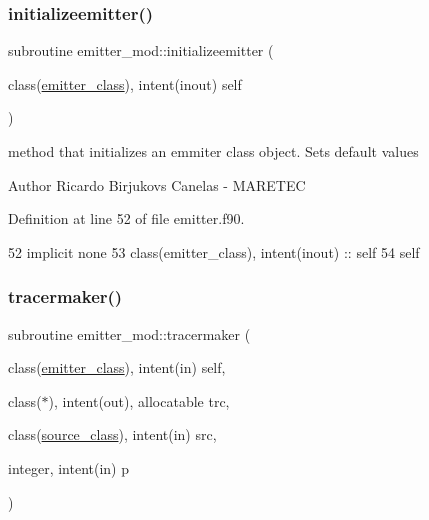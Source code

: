 \subsubsection{\texorpdfstring{initializeemitter()}{initializeemitter()}}
{\footnotesize\ttfamily subroutine emitter\+\_\+mod\+::initializeemitter (\begin{DoxyParamCaption}\item[{class(\mbox{\hyperlink{structemitter__mod_1_1emitter__class}{emitter\+\_\+class}}), intent(inout)}]{self }\end{DoxyParamCaption})\hspace{0.3cm}{\ttfamily [private]}}



method that initializes an emmiter class object. Sets default values 

\begin{DoxyAuthor}{Author}
Ricardo Birjukovs Canelas -\/ M\+A\+R\+E\+T\+EC 
\end{DoxyAuthor}


Definition at line 52 of file emitter.\+f90.


\begin{DoxyCode}
52     \textcolor{keywordtype}{implicit none}
53     \textcolor{keywordtype}{class}(emitter\_class), \textcolor{keywordtype}{intent(inout)} :: self
54     self%
\end{DoxyCode}
\mbox{\label{namespaceemitter__mod_aee7b24637d2249727bccab333e062516}} 
\subsubsection{\texorpdfstring{tracermaker()}{tracermaker()}}
{\footnotesize\ttfamily subroutine emitter\+\_\+mod\+::tracermaker (\begin{DoxyParamCaption}\item[{class(\mbox{\hyperlink{structemitter__mod_1_1emitter__class}{emitter\+\_\+class}}), intent(in)}]{self,  }\item[{class($\ast$), intent(out), allocatable}]{trc,  }\item[{class(\mbox{\hyperlink{structsources__mod_1_1source__class}{source\+\_\+class}}), intent(in)}]{src,  }\item[{integer, intent(in)}]{p }\end{DoxyParamCaption})\hspace{0.3cm}{\ttfamily [private]}}



